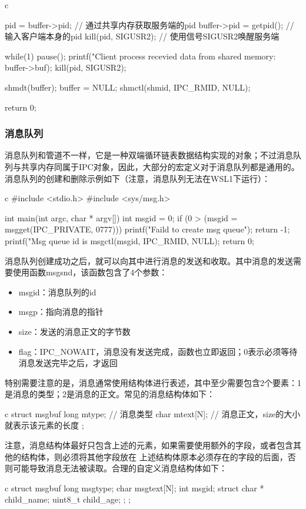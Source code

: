 \begin{code-block}{c}
{        pid = buffer->pid; // 通过共享内存获取服务端的pid
        buffer->pid = getpid(); // 输入客户端本身的pid
        kill(pid, SIGUSR2); // 使用信号SIGUSR2唤醒服务端

        while(1)
        {
                pause();
                printf("Client process recevied data from shared memory: %
                        buffer->buf);
                kill(pid, SIGUSR2);
        }

        shmdt(buffer);
        buffer = NULL;
        shmctl(shmid, IPC_RMID, NULL);

        return 0;
}
\end{code-block}

\subsubsection{消息队列}
消息队列和管道不一样，它是一种双端循环链表数据结构实现的对象；不过消息队列与共享内存同属于IPC对象，因此，大部分的宏定义对于消息队列都是通用的。
消息队列的创建和删除示例如下（注意，消息队列无法在WSL1下运行）：
\begin{code-block}{c}
#include <stdio.h>
#include <sys/msg.h>

int main(int argc, char * argv[])
{
        int msgid = 0;
        if (0 > (msgid = msgget(IPC_PRIVATE, 0777)))
        {
                printf("Faild to create msg queue\n");
                return -1;
        }
        printf("Msg queue id is %
        msgctl(msgid, IPC_RMID, NULL);
        return 0;
}
\end{code-block}

消息队列创建成功之后，就可以向其中进行消息的发送和收取。其中消息的发送需要使用函数msgsnd，该函数包含了4个参数：
\begin{itemize}
  \item msgid：消息队列的id
  \item msgp：指向消息的指针
  \item size：发送的消息正文的字节数
  \item flag：IPC\_NOWAIT，消息没有发送完成，函数也立即返回；0表示必须等待消息发送完毕之后，才返回
\end{itemize}
特别需要注意的是，消息通常使用结构体进行表述，其中至少需要包含2个要素：1是消息的类型；2是消息的正文。常见的消息结构体如下：
\begin{code-block}{c}
struct msgbuf{
        long mtype; // 消息类型
        char mtext[N]; // 消息正文，size的大小就表示该元素的长度
};
\end{code-block}
注意，消息结构体最好只包含上述的元素，如果需要使用额外的字段，或者包含其他的结构体，则必须将其他字段放在
上述结构体原本必须存在的字段的后面，否则可能导致消息无法被读取。合理的自定义消息结构体如下：
\begin{code-block}{c}
struct msgbuf{
        long msgtype;
        char msgtext[N];
        int msgid;
        struct {
            char * child_name;
            uint8_t child_age;
        };
};
\end{code-block}

